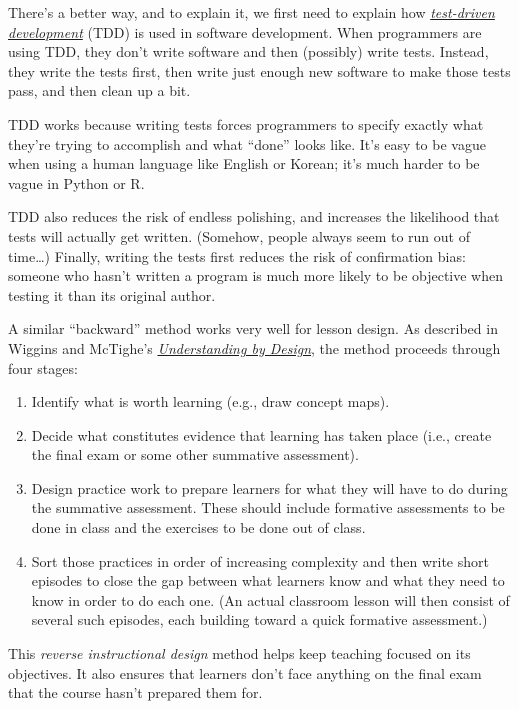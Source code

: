 There's a better way, and to explain it, we first need to explain how
\emph{\href{https://en.wikipedia.org/wiki/Test-driven_development}{test-driven
development}} (TDD) is used in software development. When programmers
are using TDD, they don't write software and then (possibly) write
tests. Instead, they write the tests first, then write just enough new
software to make those tests pass, and then clean up a bit.

TDD works because writing tests forces programmers to specify exactly
what they're trying to accomplish and what ``done'' looks like. It's
easy to be vague when using a human language like English or Korean;
it's much harder to be vague in Python or R.

TDD also reduces the risk of endless polishing, and increases the
likelihood that tests will actually get written. (Somehow, people always
seem to run out of time\ldots{}) Finally, writing the tests first
reduces the risk of confirmation bias: someone who hasn't written a
program is much more likely to be objective when testing it than its
original author.

A similar ``backward'' method works very well for lesson design. As
described in Wiggins and McTighe's
\emph{\href{http://www.amazon.com/Understanding-Design-Expanded-Grant-Wiggins/dp/0131950843/}{Understanding
by Design}}, the method proceeds through four stages:

\begin{enumerate}
\def\labelenumi{\arabic{enumi}.}
\itemsep1pt\parskip0pt
\item
  Identify what is worth learning (e.g., draw concept maps).
\item
  Decide what constitutes evidence that learning has taken place (i.e.,
  create the final exam or some other summative assessment).
\item
  Design practice work to prepare learners for what they will have to do
  during the summative assessment. These should include formative
  assessments to be done in class and the exercises to be done out of
  class.
\item
  Sort those practices in order of increasing complexity and then write
  short episodes to close the gap between what learners know and what
  they need to know in order to do each one. (An actual classroom lesson
  will then consist of several such episodes, each building toward a
  quick formative assessment.)
\end{enumerate}

This \emph{reverse instructional design} method helps keep teaching
focused on its objectives. It also ensures that learners don't face
anything on the final exam that the course hasn't prepared them for.

